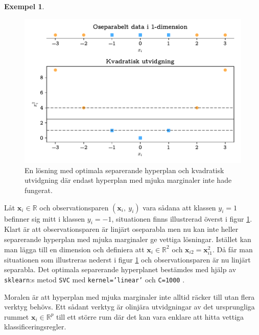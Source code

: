 \documentclass[a4paper, 12pt]{report}
\theoremstyle{definition}
\newtheorem{ex}{Exempel}[section]
\theoremstyle{remark}
\begin{document}
\begin{ex}\label{ex:olinjär}
\begin{figure}[h]
	\centering
	\includegraphics[width=0.8\linewidth, trim={0.5cm 4mm -5mm 4mm}, clip]{KandFigur3.pdf}
	\caption{\label{fig:kvadratisk}En lösning med optimala separerande hyperplan och kvadratisk utvidgning där endast hyperplan med mjuka marginaler inte hade fungerat.}
\end{figure}
Låt $\mathbf{x}_i\in\mathbb{R}$ och observationsparen $\left(\mathbf{x}_i,~y_i\right)$ vara sådana att klassen $y_i=1$ befinner sig mitt i klassen $y_i=-1$, situationen finns illustrerad överst i figur \ref{fig:kvadratisk}. Klart är att observationsparen är linjärt oseparabla men nu kan inte heller separerande hyperplan med mjuka marginaler ge vettiga lösningar. Istället kan man lägga till en dimension och definiera att $\mathbf{x}_i\in\mathbb{R}^2$ och $\mathbf{x}_{i2} = \mathbf{x}_{i1}^2$.
Då får man situationen som illustreras nederst i figur \ref{fig:kvadratisk} och observationsparen är nu linjärt separabla. Det optimala separerande hyperplanet bestämdes med hjälp av \texttt{sklearn}:s metod \texttt{SVC} med \texttt{kernel='linear'} och \texttt{C=1000} \cite{sklearn}.

Moralen är att hyperplan med mjuka marginaler inte alltid räcker till utan flera verktyg behövs. Ett sådant verktyg är olinjära utvidgningar av det ursprungliga rummet $\mathbf{x}_i\in \mathbb{R}^p$ till ett större rum där det kan vara enklare att hitta vettiga klassificeringsregler.
\end{ex}
\end{document}
